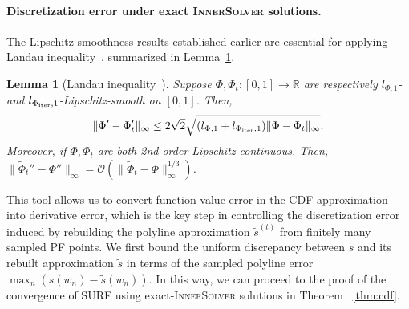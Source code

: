 \documentclass{article}
\newtheorem{lemma}{Lemma}
\newcommand{\Oc}{\mathcal{O}}
\newcommand{\Farc}{\Phi}
\begin{document}
\paragraph{Discretization error under exact \textsc{InnerSolver} solutions.}

The Lipschitz-smoothness results established earlier are essential for applying Landau inequality~\citep{hardy1952inequalities}, summarized in Lemma~\ref{lem:landau_inequality}.


\begin{lemma}[{Landau inequality~\citep{hardy1952inequalities}}]
\label{lem:landau_inequality}
Suppose $\Farc,\Farc_t:[0,1]\to\mathbb{R}$ are respectively $l_{\Farc,1}$- and $l_{\Farc_{\rm iter},1}$-Lipschitz-smooth on $[0,1]$. Then,
\begin{align}
\|\Farc'-\Farc_t'\|_\infty
\le
2\sqrt{2}\sqrt{(l_{\Farc,1}+l_{\Farc_{\rm iter},1})\|\Farc-\Farc_t\|_\infty}.
\label{eq:derivative_from_function_difference}
\end{align}
Moreover, if $\Farc,\Farc_t$ are both 2nd-order Lipschitz-continuous. Then, $\|\tilde\Farc_t''-\Farc''\|_\infty = \Oc(\|\tilde\Farc_t-\Farc\|_\infty^{1/3})$.
\end{lemma}

This tool allows us to convert function-value error in the CDF approximation into derivative error, which is the key step in controlling the discretization error induced by rebuilding the polyline approximation $\tilde s^{(t)}$ from finitely many sampled PF points. We first bound the uniform discrepancy between $s$ and its rebuilt approximation $\tilde s$ in terms of the sampled polyline error $\max_n (s(w_n)-\tilde s(w_n))$.
In this way, we can proceed to the proof of the convergence of SURF using exact-\textsc{InnerSolver} solutions in Theorem~
\ref{thm:cdf}.
\end{document}
